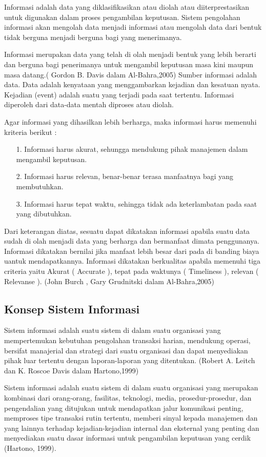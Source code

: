\documentclass{jtetiproposalskripsi}
\begin{document}
Informasi adalah data yang diklasifikasikan atau diolah atau diiterprestasikan untuk digunakan dalam proses pengambilan keputusan. Sistem pengolahan informasi akan mengolah data menjadi informasi atau mengolah data dari bentuk tidak berguna menjadi berguna bagi yang menerimanya. 

Informasi merupakan data yang telah di olah menjadi bentuk yang lebih berarti dan berguna bagi penerimanya untuk mengambil keputusan masa kini maupun masa datang.( Gordon B. Davis dalam Al-Bahra,2005)  
Sumber informasi adalah data. Data adalah kenyataan yang menggambarkan kejadian dan kesatuan nyata. Kejadian (event) adalah suatu yang terjadi pada saat tertentu. Informasi diperoleh dari data-data mentah diproses atau diolah.

Agar informasi yang dihasilkan lebih berharga, maka informasi harus memenuhi kriteria berikut :

\begin{itemize}

\item[1.] Informasi harus akurat, sehungga mendukung pihak manajemen dalam mengambil keputusan.
\item[2.] Informasi harus relevan, benar-benar terasa manfaatnya bagi yang membutuhkan.
\item[3.] Informasi harus tepat waktu, sehingga tidak ada keterlambatan pada saat yang dibutuhkan.
\end{itemize}

Dari keterangan diatas, sesuatu dapat dikatakan informasi apabila suatu data sudah di olah menjadi data yang berharga dan bermanfaat dimata penggunanya. Informasi dikatakan bernilai jika manfaat lebih besar dari pada di banding biaya uantuk mendapatkannya. Informasi dikatakan berkualitas apabila memenuhi tiga criteria yaitu Akurat ( Accurate ), tepat pada waktunya ( Timeliness ), relevan ( Relevanse ). (John Burch , Gary Grudnitski dalam Al-Bahra,2005)


\subsection{Konsep Sistem Informasi}
Sistem informasi adalah suatu sistem di dalam suatu organisasi yang mempertemukan kebutuhan pengolahan transaksi harian, mendukung operasi, bersifat manajerial dan strategi dari suatu organisasi dan dapat menyediakan pihak luar tertentu dengan laporan-laporan yang ditentukan. (Robert A. Leitch dan K. Roscoe Davis dalam Hartono,1999)

Sistem informasi adalah suatu sistem di dalam suatu organisasi yang merupakan kombinasi dari orang-orang, fasilitas, teknologi, media, prosedur-prosedur, dan pengendalian yang ditujukan untuk mendapatkan jalur komunikasi penting, memproses tipe transaksi rutin tertentu, memberi sinyal kepada manajemen dan yang lainnya terhadap kejadian-kejadian internal dan eksternal yang penting dan menyediakan suatu dasar informasi untuk pengambilan keputusan yang cerdik (Hartono, 1999).
\end{document}
